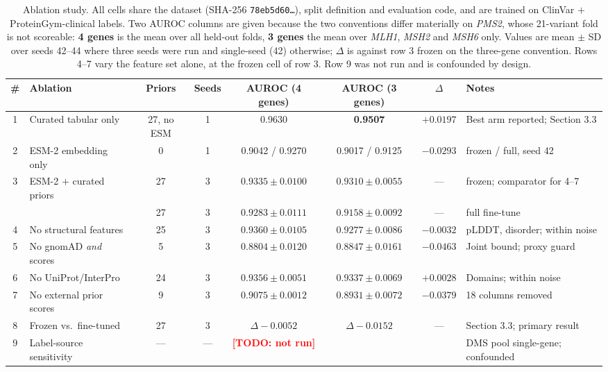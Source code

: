 \documentclass{bioinfo}
\newcommand{\todo}[1]{\textcolor{red}{\textbf{[TODO: #1]}}}
\newcommand{\gene}[1]{\textit{#1}}
\begin{document}
\begin{table}[t]
\caption{Ablation study. All cells share the dataset
(SHA-256 \texttt{78eb5d60\ldots}), split definition and evaluation code, and are
trained on ClinVar $+$ ProteinGym-clinical labels. Two AUROC columns are given
because the two conventions differ materially on \gene{PMS2}, whose 21-variant
fold is not scoreable: \textbf{4 genes} is the mean over all held-out folds,
\textbf{3 genes} the mean over \gene{MLH1}, \gene{MSH2} and \gene{MSH6} only.
Values are mean $\pm$ SD over seeds 42--44 where three seeds were run and
single-seed (42) otherwise; $\Delta$ is against row 3 frozen on the
three-gene convention. Rows 4--7 vary the feature set alone, at the frozen cell
of row 3. Row 9 was not run and is confounded by design.}
\label{tab:ablation}
\centering
\footnotesize
\setlength{\tabcolsep}{3pt}
\begin{tabularx}{\textwidth}{@{}c L{0.95} c c c c c L{1.05}@{}}
\toprule
\# & Ablation & Priors & Seeds & AUROC (4 genes) & AUROC (3 genes) & $\Delta$ & Notes \\
 & Curated tabular only     & 27, no ESM & 1 & 0.9630 & \textbf{0.9507} & $+0.0197$ & Best arm reported; Section 3.3 \\
2 & ESM-2 embedding only     & 0  & 1 & 0.9042 / 0.9270 & 0.9017 / 0.9125 & $-0.0293$ & frozen / full, seed 42 \\
3 & ESM-2 $+$ curated priors & 27 & 3 & $0.9335 \pm 0.0100$ & $0.9310 \pm 0.0055$ & --- & frozen; comparator for 4--7 \\
  &                          & 27 & 3 & $0.9283 \pm 0.0111$ & $0.9158 \pm 0.0092$ & --- & full fine-tune \\
4 & No structural features   & 25 & 3 & $0.9360 \pm 0.0105$ & $0.9277 \pm 0.0086$ & $-0.0032$ & pLDDT, disorder; within noise \\
5 & No gnomAD \emph{and} scores & 5 & 3 & $0.8804 \pm 0.0120$ & $0.8847 \pm 0.0161$ & $\mathbf{-0.0463}$ & Joint bound; proxy guard \\
6 & No UniProt/InterPro      & 24 & 3 & $0.9356 \pm 0.0051$ & $0.9337 \pm 0.0069$ & $+0.0028$ & Domains; within noise \\
7 & No external prior scores & 9  & 3 & $0.9075 \pm 0.0012$ & $0.8931 \pm 0.0072$ & $\mathbf{-0.0379}$ & 18 columns removed \\
8 & Frozen vs.\ fine-tuned   & 27 & 3 & $\Delta -0.0052$ & $\Delta -0.0152$ & --- & Section 3.3; primary result \\
9 & Label-source sensitivity & --- & --- & \todo{not run} & & & DMS pool single-gene; confounded \\
\bottomrule
\end{tabularx}
\end{table}
\end{document}
